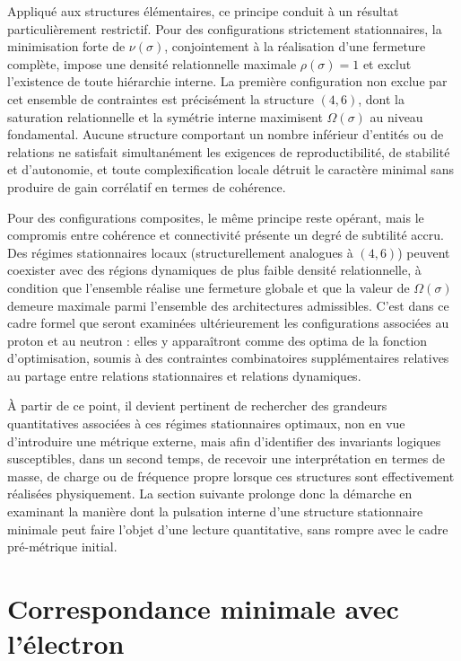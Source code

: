 \documentclass[11pt,a4paper]{article}
\begin{document}
Appliqué aux structures élémentaires, ce principe conduit à un résultat particulièrement restrictif. Pour des configurations strictement stationnaires, la minimisation forte de \(\nu\left(\sigma\right)\), conjointement à la réalisation d’une fermeture complète, impose une densité relationnelle maximale \(\rho\left(\sigma\right)=1\) et exclut l’existence de toute hiérarchie interne. La première configuration non exclue par cet ensemble de contraintes est précisément la structure \(\left(4, 6\right)\), dont la saturation relationnelle et la symétrie interne maximisent \(\Omega\left(\sigma\right)\) au niveau fondamental. Aucune structure comportant un nombre inférieur d’entités ou de relations ne satisfait simultanément les exigences de reproductibilité, de stabilité et d’autonomie, et toute complexification locale détruit le caractère minimal sans produire de gain corrélatif en termes de cohérence.

Pour des configurations composites, le même principe reste opérant, mais le compromis entre cohérence et connectivité présente un degré de subtilité accru. Des régimes stationnaires locaux (structurellement analogues à \(\left(4, 6\right)\)) peuvent coexister avec des régions dynamiques de plus faible densité relationnelle, à condition que l’ensemble réalise une fermeture globale et que la valeur de \(\Omega\left(\sigma\right)\) demeure maximale parmi l’ensemble des architectures admissibles. C’est dans ce cadre formel que seront examinées ultérieurement les configurations associées au proton et au neutron : elles y apparaîtront comme des optima de la fonction d’optimisation, soumis à des contraintes combinatoires supplémentaires relatives au partage entre relations stationnaires et relations dynamiques.

À partir de ce point, il devient pertinent de rechercher des grandeurs quantitatives associées à ces régimes stationnaires optimaux, non en vue d’introduire une métrique externe, mais afin d’identifier des invariants logiques susceptibles, dans un second temps, de recevoir une interprétation en termes de masse, de charge ou de fréquence propre lorsque ces structures sont effectivement réalisées physiquement. La section suivante prolonge donc la démarche en examinant la manière dont la pulsation interne d’une structure stationnaire minimale peut faire l’objet d’une lecture quantitative, sans rompre avec le cadre pré-métrique initial.

\section{Correspondance minimale avec l’électron}
\end{document}
